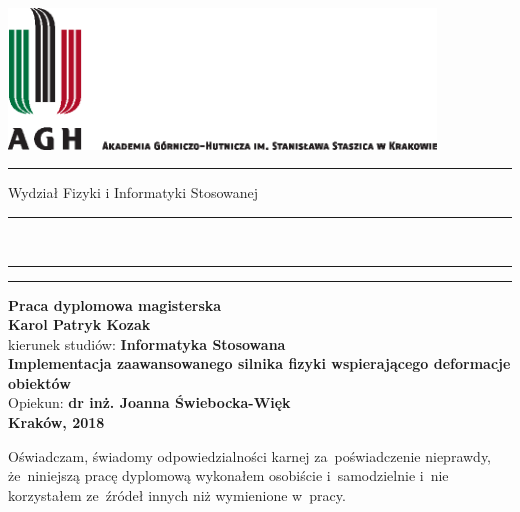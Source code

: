 \documentclass[11pt]{aghdpl}
\author{Karol Patryk Kozak}
\date{2017}
\begin{document}
	
	\thispagestyle{empty}
	\includegraphics[height=37.5mm]{images/agh_nzw_a_pl_1w_wbr_cmyk}\\
	\rule{30mm}{0pt}
	{\Large\textsf{Wydział Fizyki i Informatyki Stosowanej}}\\
	\rule{\textwidth}{3pt}\\
	\rule[2.75ex]
	{\textwidth}{1pt}%
	\vspace{1em}\rule{30mm}{0pt}
	\begin{center}
		{\bf\huge\textsf{Praca dyplomowa magisterska }}\\
		\vspace{13ex}
		{\bf\LARGE\textsf{Karol Patryk Kozak }}\\
		\vspace{3ex}
		{\sf \normalsize kierunek studiów:} {\bf\normalsize\textsf{Informatyka Stosowana}}\\
		\vspace{15ex}
		{\bf\Huge\textsf{Implementacja zaawansowanego silnika fizyki wspierającego deformacje obiektów}}\\
		\vspace{14ex}
		{\sf \LARGE Opiekun:} {\bf\LARGE\textsf{dr inż. Joanna Świebocka-Więk}}\\
		\vspace{22ex}
		\textsf{\bf\Large\textsf{Kraków, 2018}}
		
	\end{center}
	
	
	\newpage
	
	{\sf Oświadczam, świadomy odpowiedzialności karnej za~poświadczenie nieprawdy, że~niniejszą pracę dyplomową wykonałem osobiście i~samodzielnie i~nie korzystałem ze~źródeł innych niż wymienione w~pracy.}
	
\end{document}
